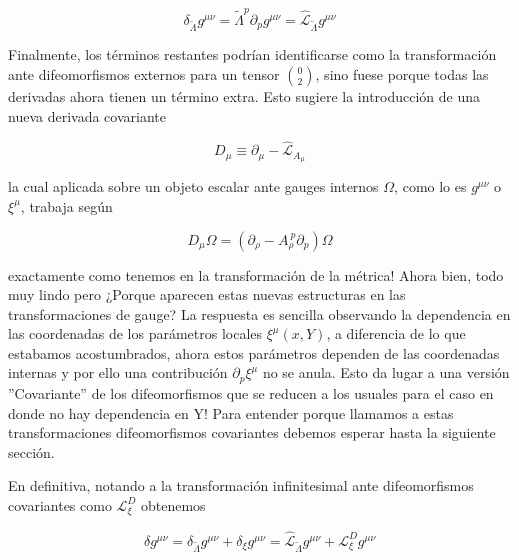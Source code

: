 \documentclass{article}
\numberwithin{equation}{section}
\begin{document}
\begin{equation}
\delta_{\widetilde{\Lambda}} g^{\mu \nu} = \widetilde{\Lambda}^{p} \partial_p g^{\mu \nu} = \hat{\mathcal{L}}_{\widetilde{\Lambda}} g^{\mu \nu}
\end{equation}

Finalmente, los términos restantes podrían identificarse como la transformación ante difeomorfismos externos para un tensor $ \binom{0}{2} $, sino fuese porque todas las derivadas ahora tienen un término extra. Esto sugiere la introducción de una nueva derivada covariante

\begin{equation}\label{Dcov}
D_{\mu} \equiv \partial_{\mu} - \hat{\mathcal{L}}_{A_{\mu}}
\end{equation}

la cual aplicada sobre un objeto escalar ante gauges internos $ \Omega $, como lo es $ g^{\mu \nu} $ o $ \xi^{\mu} $, trabaja según

\begin{equation}
D_{\mu} \Omega = \left( \partial_{\rho} - A_{\rho}^{\ p} \partial_p \right) \Omega
\end{equation}

exactamente como tenemos en la transformación de la métrica! Ahora bien, todo muy lindo pero ¿Porque aparecen estas nuevas estructuras en las transformaciones de gauge? La respuesta es sencilla observando la dependencia en las coordenadas de los parámetros locales $ \xi^{\mu}(x,Y) $, a diferencia de lo que estabamos acostumbrados, ahora estos parámetros dependen de las coordenadas internas y por ello una contribución $ \partial_p \xi^{\mu} $ no se anula. Esto da lugar a una versión ''Covariante'' de los difeomorfismos que se reducen a los usuales para el caso en donde no hay dependencia en Y! Para entender porque llamamos a estas transformaciones difeomorfismos covariantes debemos esperar hasta la siguiente sección.

En definitiva, notando a la transformación infinitesimal ante difeomorfismos covariantes como $ \mathcal{L}_{\xi}^{D} $ obtenemos 

\begin{boxeq}
	\begin{equation}\label{deltag}
	\delta g^{\mu \nu} = \delta_{\widetilde{\Lambda}} g^{\mu \nu} + \delta_{\xi} g^{\mu \nu} = 
	\hat{\mathcal{L}}_{\widetilde{\Lambda}} g^{\mu \nu} + \mathcal{L}_{\xi}^{D}  g^{\mu \nu}
	\end{equation}
\end{boxeq}
\end{document}
